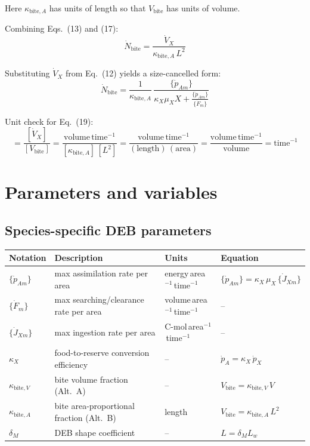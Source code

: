 \documentclass[11pt]{article}
\begin{document}
Here $\kappa_{\text{bite},A}$ has units of length so that $V_{\text{bite}}$ has units of volume.

Combining Eqs.~(13) and (17):
\begin{equation}
  \dot N_{\text{bite}} = \frac{\dot V_X}{\kappa_{\text{bite},A}\,L^2}\tag{18}
\end{equation}

Substituting $\dot V_X$ from Eq.~(12) yields a size-cancelled form:
\begin{equation}
  \dot N_{\text{bite}}
  = \frac{1}{\kappa_{\text{bite},A}}\,\frac{\{\dot p_{Am}\}}{\kappa_X\mu_X X + \frac{\{\dot p_{Am}\}}{\{\dot F_m\}}}\tag{19}
\end{equation}

Unit check for Eq.~(19):
\begin{equation*}
  [\dot N_{\text{bite}}] = \frac{[\dot V_X]}{[V_{\text{bite}}]} = \frac{\text{volume}\,\text{time}^{-1}}{[\kappa_{\text{bite},A}]\,[L^2]} = \frac{\text{volume}\,\text{time}^{-1}}{(\text{length})\,(\text{area})} = \frac{\text{volume}\,\text{time}^{-1}}{\text{volume}} = \text{time}^{-1}
\end{equation*}

\appendix

\renewcommand{\arraystretch}{1.2}

\section{Parameters and variables}
\label{app:params}

\subsection*{Species-specific DEB parameters}

\begin{center}
\begin{tabular}{l|l|l|l}
  \hline
  Notation & Description & Units & Equation \\
  \hline\hline
  $\{\dot{p}_{Am}\}$ & max assimilation rate per area & energy\,area$^{-1}$\,time$^{-1}$ & $\{\dot{p}_{Am}\} = \kappa_X\,\mu_X\,\{\dot{J}_{Xm}\}$ \\
  $\{\dot{F}_m\}$ & max searching/clearance rate per area & volume\,area$^{-1}$\,time$^{-1}$ & -- \\
  $\{\dot{J}_{Xm}\}$ & max ingestion rate per area & C-mol\,area$^{-1}$\,time$^{-1}$ & -- \\
  $\kappa_X$ & food-to-reserve conversion efficiency & -- & $\dot{p}_A = \kappa_X\,\dot{p}_X$ \\
  $\kappa_{\text{bite},V}$ & bite volume fraction (Alt.~A) & -- & $V_{\text{bite}} = \kappa_{\text{bite},V}\,V$ \\
  $\kappa_{\text{bite},A}$ & bite area-proportional fraction (Alt.~B) & length & $V_{\text{bite}} = \kappa_{\text{bite},A}\,L^2$ \\
  $\delta_M$ & DEB shape coefficient & -- & $L = \delta_M L_w$ \\
  \hline
\end{tabular}
\end{center}
\end{document}
